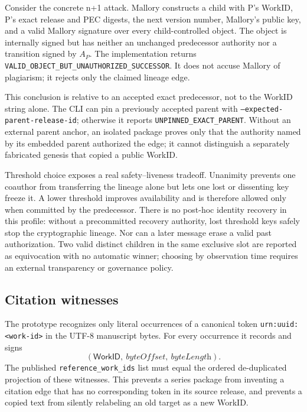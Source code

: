 \documentclass[11pt]{article}
\newcommand{\workid}{\textsf{WorkID}}
\begin{document}
Consider the concrete n+1 attack. Mallory constructs a child with P's WorkID,
P's exact release and PEC digests, the next version number, Mallory's public
key, and a valid Mallory signature over every child-controlled object. The
object is internally signed but has neither an unchanged predecessor authority
nor a transition signed by $A_P$. The implementation returns
\texttt{VALID\_OBJECT\_BUT\_UNAUTHORIZED\_SUCCESSOR}. It does not accuse
Mallory of plagiarism; it rejects only the claimed lineage edge.

This conclusion is relative to an accepted exact predecessor, not to the
WorkID string alone. The CLI can pin a previously accepted parent with
\texttt{--expected-parent-release-id}; otherwise it reports
\texttt{UNPINNED\_EXACT\_PARENT}. Without an external parent anchor, an isolated
package proves only that the authority named by its embedded parent authorized
the edge; it cannot distinguish a separately fabricated genesis that copied a
public WorkID.

Threshold choice exposes a real safety--liveness tradeoff. Unanimity prevents
one coauthor from transferring the lineage alone but lets one lost or dissenting
key freeze it. A lower threshold improves availability and is therefore allowed
only when committed by the predecessor. There is no post-hoc identity recovery
in this profile: without a precommitted recovery authority, lost threshold keys
safely stop the cryptographic lineage. Nor can a later message erase a valid
past authorization. Two valid distinct children in the same exclusive slot are
reported as equivocation with no automatic winner; choosing by observation time
requires an external transparency or governance policy.

\subsection{Citation witnesses}

The prototype recognizes only literal occurrences of a canonical token \texttt{urn:uuid:<work-id>} in the UTF-8 manuscript bytes. For every occurrence it records and signs
\[
  (\workid,\ \textit{byteOffset},\ \textit{byteLength}).
\]
The published \texttt{reference\_work\_ids} list must equal the ordered de-duplicated projection of these witnesses. This prevents a series package from inventing a citation edge that has no corresponding token in its source release, and prevents a copied text from silently relabeling an old target as a new \workid.
\end{document}
